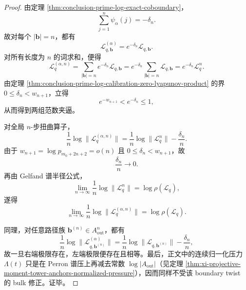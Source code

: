 \begin{proof}
由定理 \ref{thm:conclusion-prime-log-exact-coboundary}，
\[
\sum_{j=1}^{n}\psi_\alpha(j)=-\delta_n.
\]
故对每个 \(|\mathbf b|=n\)，都有
\[
\mathcal L_{q,\mathbf b}^{(\alpha)}=e^{-\delta_n}\mathcal L_{q,\mathbf b}.
\]
对所有长度为 \(n\) 的词求和，便得
\[
\mathcal L_q^{(\alpha,n)}
=
\sum_{|\mathbf b|=n}e^{-\delta_n}\mathcal L_{q,\mathbf b}
=
e^{-\delta_n}\sum_{|\mathbf b|=n}\mathcal L_{q,\mathbf b}
=
e^{-\delta_n}\mathcal L_q^n.
\]
由定理 \ref{thm:conclusion-prime-log-calibration-zero-lyapunov-product} 的界
\(
0\le \delta_n<w_{n+1}
\)，立得
\[
e^{-w_{n+1}}
<
e^{-\delta_n}
\le 1,
\]
从而得到两组范数夹逼。

对全局 \(n\)-步扭曲算子，
\[
\frac1n\log \|\mathcal L_q^{(\alpha,n)}\|
=
\frac1n\log \|\mathcal L_q^n\|
-\frac{\delta_n}{n}.
\]
由于 \(w_{n+1}=\log p_{m_0+2n+2}=o(n)\) 且 \(0\le \delta_n<w_{n+1}\)，故
\[
\frac{\delta_n}{n}\longrightarrow 0.
\]
再由 Gelfand 谱半径公式，
\[
\lim_{n\to\infty}\frac1n\log \|\mathcal L_q^n\|
=
\log\rho(\mathcal L_q),
\]
遂得
\[
\lim_{n\to\infty}\frac1n\log \|\mathcal L_q^{(\alpha,n)}\|
=
\log\rho(\mathcal L_q).
\]

同理，对任意路径族 \(\mathbf b^{(n)}\in A_{\mathrm{out}}^n\)，都有
\[
\frac1n\log \|\mathcal L_{q,\mathbf b^{(n)}}^{(\alpha)}\|
=
\frac1n\log \|\mathcal L_{q,\mathbf b^{(n)}}\|
-\frac{\delta_n}{n},
\]
故一旦右端极限存在，左端极限便存在且相等。最后，正文中的连续归一化压力 \(\Lambda(t)\) 只是在 Perron 谱压上再减去常数 \(\log|A_{\mathrm{out}}|\)（见定理 \ref{thm:xi-projective-moment-tower-anchors-normalized-pressure}），因而同样不受该 boundary twist 的 bulk 修正。证毕。
\end{proof}

